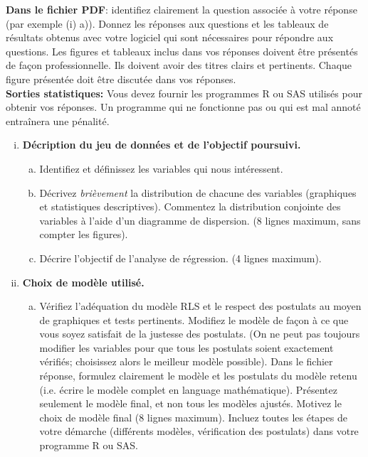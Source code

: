 \documentclass[letter, 11pt]{article}
\begin{document}
{\bf Dans le fichier PDF}: identifiez clairement la question associée à votre réponse (par exemple (i) a)). Donnez les réponses aux questions et les tableaux de résultats obtenus avec votre logiciel qui sont nécessaires pour
répondre aux questions. Les figures et tableaux inclus dans vos réponses doivent être présentés de façon professionnelle. Ils doivent avoir des titres clairs et pertinents. Chaque figure présentée doit être discutée dans vos réponses. \\

\textbf{Sorties statistiques:}
Vous devez fournir les programmes R ou SAS utilisés pour obtenir vos réponses. Un programme qui ne fonctionne pas ou qui est mal annoté entraînera une pénalité. \\


\begin{enumerate}[(i)]
	\item {\bf Décription du jeu de données et de l'objectif poursuivi.}
\begin{enumerate}[a)]
\item Identifiez et définissez les variables qui nous intéressent.
\item Décrivez {\it brièvement} la distribution de chacune des variables (graphiques et statistiques descriptives). Commentez la distribution conjointe des variables à l'aide d'un diagramme de dispersion.  (8 lignes maximum, sans compter les figures).
\item Décrire l'objectif de l'analyse de régression. (4 lignes maximum).
\end{enumerate}
	\item {\bf Choix de modèle utilisé.}
\begin{enumerate}[a)]
	\item Vérifiez l'adéquation du mod\`ele RLS et le respect des postulats au moyen de graphiques et tests pertinents. Modifiez le modèle de façon à ce que vous soyez satisfait de la justesse des postulats. (On ne peut pas toujours modifier les variables pour que tous les postulats soient exactement vérifiés;  choisissez alors le meilleur modèle possible). Dans le fichier réponse, formulez clairement le modèle et les postulats du mod\`ele retenu (i.e. écrire le modèle complet en language mathématique). Présentez seulement le modèle final, et non tous les modèles ajustés. Motivez le choix de modèle final (8 lignes maximum). Incluez toutes les étapes de votre démarche (différents modèles, vérification des postulats) dans votre programme R ou SAS. 

\end{enumerate}
\end{enumerate}
\end{document}
